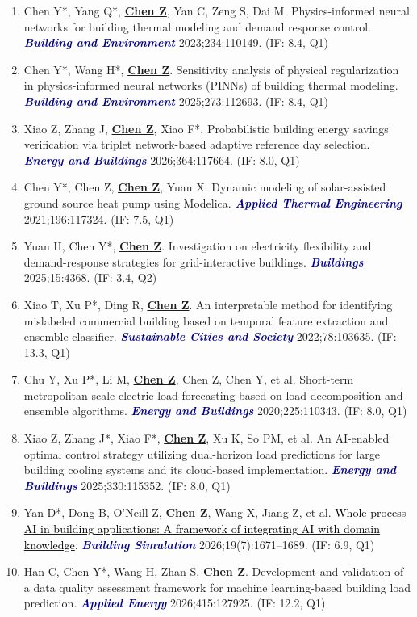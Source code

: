 \documentclass[11pt,a4paper]{article}
\newcommand{\me}[1]{\underline{\textbf{#1}}}
\newcommand{\journal}[1]{\textcolor{darkblue}{\textbf{\textit{#1}}}}
\begin{document}
\begin{enumerate}
\item Chen Y*, Yang Q*, \me{Chen Z}, Yan C, Zeng S, Dai M. Physics-informed neural networks for building thermal modeling and demand response control. \journal{Building and Environment} 2023;234:110149. (IF: 8.4, Q1)
\item Chen Y*, Wang H*, \me{Chen Z}. Sensitivity analysis of physical regularization in physics-informed neural networks (PINNs) of building thermal modeling. \journal{Building and Environment} 2025;273:112693. (IF: 8.4, Q1)
\item Xiao Z, Zhang J, \me{Chen Z}, Xiao F*. Probabilistic building energy savings verification via triplet network-based adaptive reference day selection. \journal{Energy and Buildings} 2026;364:117664. (IF: 8.0, Q1)
\item Chen Y*, Chen Z, \me{Chen Z}, Yuan X. Dynamic modeling of solar-assisted ground source heat pump using Modelica. \journal{Applied Thermal Engineering} 2021;196:117324. (IF: 7.5, Q1)
\item Yuan H, Chen Y*, \me{Chen Z}. Investigation on electricity flexibility and demand-response strategies for grid-interactive buildings. \journal{Buildings} 2025;15:4368. (IF: 3.4, Q2)
\item Xiao T, Xu P*, Ding R, \me{Chen Z}. An interpretable method for identifying mislabeled commercial building based on temporal feature extraction and ensemble classifier. \journal{Sustainable Cities and Society} 2022;78:103635. (IF: 13.3, Q1)
\item Chu Y, Xu P*, Li M, \me{Chen Z}, Chen Z, Chen Y, et al. Short-term metropolitan-scale electric load forecasting based on load decomposition and ensemble algorithms. \journal{Energy and Buildings} 2020;225:110343. (IF: 8.0, Q1)
\item Xiao Z, Zhang J*, Xiao F*, \me{Chen Z}, Xu K, So PM, et al. An AI-enabled optimal control strategy utilizing dual-horizon load predictions for large building cooling systems and its cloud-based implementation. \journal{Energy and Buildings} 2025;330:115352. (IF: 8.0, Q1)
\item Yan D*, Dong B, O'Neill Z, \me{Chen Z}, Wang X, Jiang Z, et al. \href{https://doi.org/10.1007/s12273-026-1487-z}{\textcolor{black}{Whole-process AI in building applications: A framework of integrating AI with domain knowledge}}. \journal{Building Simulation} 2026;19(7):1671--1689. (IF: 6.9, Q1)
\item Han C, Chen Y*, Wang H, Zhan S, \me{Chen Z}. Development and validation of a data quality assessment framework for machine learning-based building load prediction. \journal{Applied Energy} 2026;415:127925. (IF: 12.2, Q1)

\end{enumerate}
\end{document}
